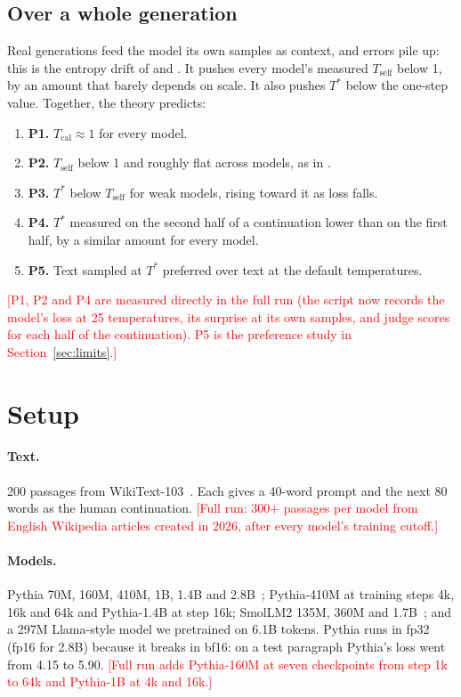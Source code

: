 \documentclass[10pt]{article}
\newcommand{\todo}[1]{\textcolor{red}{[#1]}}
\newcommand{\Ts}{T^{*}}
\begin{document}
\subsection{Over a whole generation}
\label{sec:accumulation}

Real generations feed the model its own samples as context, and errors pile up: this is the entropy drift of \citet{braverman2020calibration} and \citet{cao2025entropy}. It pushes every model's measured $T_{\text{self}}$ below 1, by an amount that barely depends on scale. It also pushes $\Ts$ below the one-step value. Together, the theory predicts:

\begin{enumerate}
    \item \textbf{P1.} $T_{\text{cal}} \approx 1$ for every model.
    \item \textbf{P2.} $T_{\text{self}}$ below 1 and roughly flat across models, as in \citet{cao2025entropy}.
    \item \textbf{P3.} $\Ts$ below $T_{\text{self}}$ for weak models, rising toward it as loss falls.
    \item \textbf{P4.} $\Ts$ measured on the second half of a continuation lower than on the first half, by a similar amount for every model.
    \item \textbf{P5.} Text sampled at $\Ts$ preferred over text at the default temperatures.
\end{enumerate}

\todo{P1, P2 and P4 are measured directly in the full run (the script now records the model's loss at 25 temperatures, its surprise at its own samples, and judge scores for each half of the continuation). P5 is the preference study in Section~\ref{sec:limits}.}

\section{Setup}
\label{sec:setup}

\paragraph{Text.} 200 passages from WikiText-103~\citep{merity2016pointer}. Each gives a 40-word prompt and the next 80 words as the human continuation. \todo{Full run: 300+ passages per model from English Wikipedia articles created in 2026, after every model's training cutoff.}

\paragraph{Models.} Pythia 70M, 160M, 410M, 1B, 1.4B and 2.8B~\citep{biderman2023pythia}; Pythia-410M at training steps 4k, 16k and 64k and Pythia-1.4B at step 16k; SmolLM2 135M, 360M and 1.7B~\citep{allal2025smollm2}; and a 297M Llama-style model we pretrained on 6.1B tokens. Pythia runs in fp32 (fp16 for 2.8B) because it breaks in bf16: on a test paragraph Pythia's loss went from 4.15 to 5.90. \todo{Full run adds Pythia-160M at seven checkpoints from step 1k to 64k and Pythia-1B at 4k and 16k.}
\end{document}
